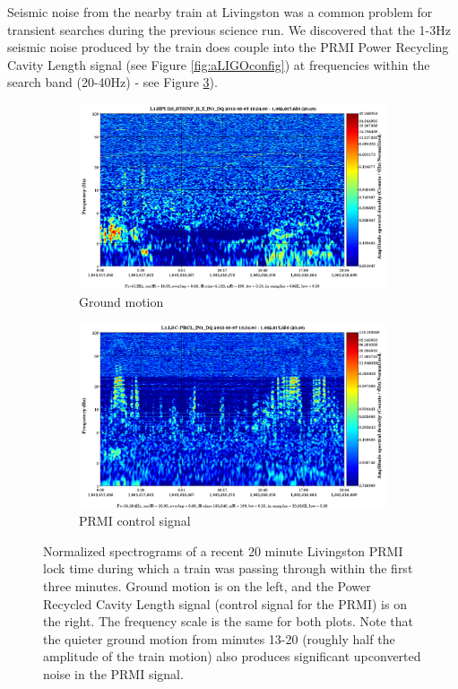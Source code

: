 Seismic noise from the nearby train at Livingston was a common problem for transient \gw{} searches during the previous science run. 
We discovered that the 1-3Hz seismic noise produced by the train does couple into the PRMI Power Recycling Cavity Length signal (see Figure \ref{fig:aLIGOconfig}) at frequencies within the \gw{} search band (20-40Hz) - see Figure \ref{fig:TRAIN}). 

\begin{figure}[htb]
\centering
\begin{subfigure}{.48\textwidth}
  \centering
  \includegraphics[width=\linewidth]{figures/GroundMotionSpec.png}
  \caption{Ground motion}
  \label{fig:TrainGroundSpec}
\end{subfigure}%
\begin{subfigure}{.48\textwidth}
  \centering
  \includegraphics[width=\linewidth]{figures/PRMI_PRCL_spec.png}
  \caption{PRMI control signal}
  \label{fig:TrainPRCL}
\end{subfigure}
\caption{Normalized spectrograms of a recent 20 minute Livingston PRMI lock time during which a train was passing through within the first three minutes. Ground motion is on the left, and the Power Recycled Cavity Length signal (control signal for the PRMI) is on the right. The frequency scale is the same for both plots. Note that the quieter ground motion from minutes 13-20 (roughly half the amplitude of the train motion) also produces significant upconverted noise in the PRMI signal.}
\label{fig:TRAIN}
\end{figure}

